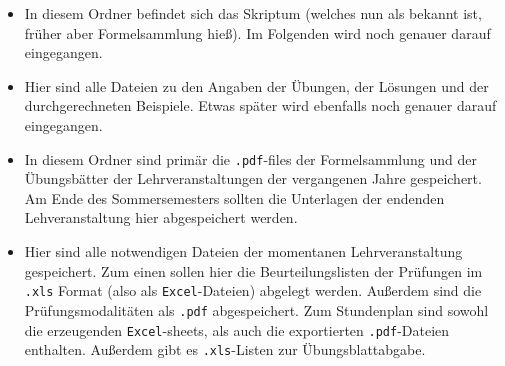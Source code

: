 \begin{itemize}
  \item {} In diesem Ordner befindet sich das
    Skriptum (welches nun als bekannt ist, früher
    aber \glqq{}Formelsammlung\grqq{} hieß). Im Folgenden wird noch genauer
    darauf eingegangen.
  \item {} Hier sind alle Dateien
    zu den Angaben der Übungen, der Lösungen und der durchgerechneten Beispiele.
    Etwas später wird ebenfalls noch genauer darauf eingegangen.
  \item {} In diesem Ordner sind primär die
    {\tt .pdf}-files der Formelsammlung und der Übungsbätter der
    Lehrveranstaltungen der vergangenen Jahre gespeichert. Am Ende des
    Sommersemesters sollten die Unterlagen der endenden Lehveranstaltung hier
    abgespeichert werden.
   \item {} Hier sind alle
     notwendigen Dateien der momentanen Lehrveranstaltung gespeichert. Zum
     einen sollen hier die Beurteilungslisten der Prüfungen im {\tt .xls}
     Format (also als {\tt Excel}-Dateien) abgelegt werden. Außerdem sind die
     Prüfungsmodalitäten als {\tt .pdf} abgespeichert. Zum Stundenplan sind
     sowohl die erzeugenden {\tt Excel}-sheets, als auch die exportierten
     {\tt .pdf}-Dateien enthalten. Außerdem gibt es {\tt .xls}-Listen zur 
     Übungsblattabgabe.
\end{itemize}

